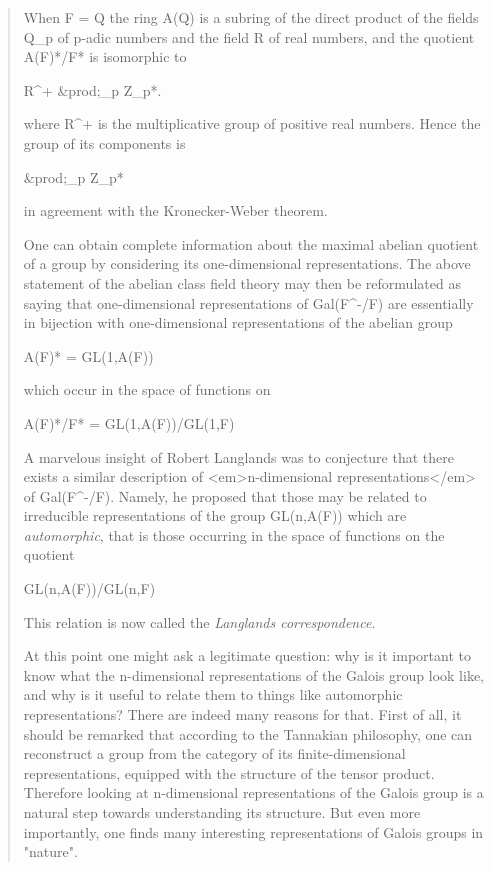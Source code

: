 \begin{quote}
  When F = Q the ring A(Q) is a subring of the direct product of the 
  fields Q_{p} of p-adic numbers and the field R of real numbers, and 
  the quotient A(F)*/F* is isomorphic to 

  R^{+} \times  &prod;_{p} Z_{p}*. 

  where R^{+} is the multiplicative group of positive real numbers.
  Hence the group of its components is

  &prod;_{p} Z_{p}*

  in agreement with the Kronecker-Weber theorem.

  One can obtain complete information about the maximal abelian 
  quotient of a group by considering its one-dimensional 
  representations.  The above statement of the abelian class field 
  theory may then be reformulated as saying that one-dimensional 
  representations of Gal(F^{-}/F) are essentially in bijection with 
  one-dimensional representations of the abelian group 

  A(F)* = GL(1,A(F)) 

  which occur in the space of functions on

  A(F)*/F* = GL(1,A(F))/GL(1,F)

  A marvelous insight of Robert Langlands was to conjecture that 
  there exists a similar description of <em>n-dimensional 
  representations</em> of Gal(F^{-}/F). Namely, he proposed that those 
  may be related to irreducible representations of the group 
  GL(n,A(F)) which are \emph{automorphic}, that is those occurring in 
  the space of functions on the quotient 

  GL(n,A(F))/GL(n,F)

  This relation is now called the \emph{Langlands correspondence}.

  At this point one might ask a legitimate question: why is it 
  important to know what the n-dimensional representations of the 
  Galois group look like, and why is it useful to relate them to 
  things like automorphic representations?  There are indeed many 
  reasons for that.  First of all, it should be remarked that 
  according to the Tannakian philosophy, one can reconstruct a 
  group from the category of its finite-dimensional representations, 
  equipped with the structure of the tensor product.  Therefore 
  looking at n-dimensional representations of the Galois group is 
  a natural step towards understanding its structure.  But even 
  more importantly, one finds many interesting representations of 
  Galois groups in "nature".  


\end{quote}
